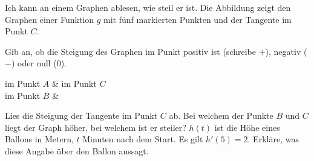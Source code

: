 \begin{aufgabe}{Ich kann an einem Graphen ablesen, wie steil er ist. Die Abbildung zeigt den Graphen einer Funktion $g$ mit fünf markierten Punkten und der Tangente im Punkt $C$.}

\begin{ksys}[xmin=-4,xmax=4,ymin=-3,ymax=3,ablesen]
\end{ksys}

Gib an, ob die Steigung des Graphen im Punkt positiv ist (schreibe $+$), negativ ($-$) oder null ($0$).
\begin{teilezwei}
\tz im Punkt $A$ \leerfeld & \tz im Punkt $C$ \leerfeld \\
\tz im Punkt $B$ \leerfeld & \\
\end{teilezwei}
\begin{teile}
\teil Lies die Steigung der Tangente im Punkt $C$ ab. 
\teil Bei welchem der Punkte $B$ und $C$ liegt der Graph höher, bei welchem ist er steiler?
\teil $h(t)$ ist die Höhe eines Ballons in Metern, $t$ Minuten nach dem Start. Es gilt $h'(5) = 2$. Erkläre, was diese Angabe über den Ballon aussagt.
\end{teile}
\end{aufgabe}
